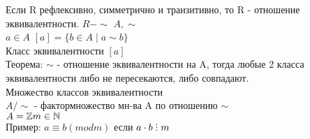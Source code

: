 
Если R рефлексивно, симметрично и транзитивно, то R - отношение эквивалентности. $ R - \sim $
$A, \sim$ \\
$ a \in A $ $ [a] = \{ b \in A \mid a \sim b \} $ \\
Класс эквивалентности $ [a] $\\
Теорема: $ \sim $ - отношение эквивалентности на A, тогда любые 2 класса эквивалентности либо не пересекаются, либо совпадают.\\
Множество классов эквивалентности \\
$ A / \sim $ - фактормножество мн-ва A по отношению $\sim$ \\
$ A = \mathbb{Z} m \in \mathbb{N}$ \\
Пример: $ a \equiv b (mod m) $ если $a \cdot b \divby m$ \\

